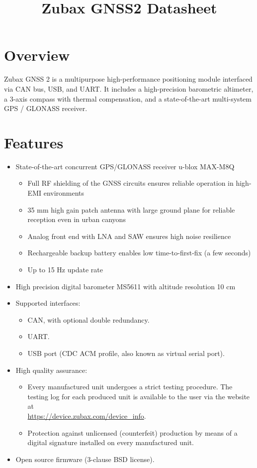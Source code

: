 \documentclass{zubaxdoc}
\title{Zubax GNSS2 Datasheet}
\begin{document}
\frontmatter

\begin{titlepage}

\section*{Overview}

Zubax GNSS 2 is a multipurpose high-performance positioning module interfaced via CAN bus, USB, and UART. It includes a high-precision barometric altimeter, a 3-axis compass with thermal compensation, and a state-of-the-art multi-system GPS / GLONASS receiver.
\section*{Features}

\begin{itemize}
    \item State-of-the-art concurrent GPS/GLONASS receiver u-blox MAX-M8Q
    \begin{itemize}
    		\item Full RF shielding of the GNSS circuits ensures reliable operation in high-EMI environments
    		\item 35 mm high gain patch antenna with large ground plane for reliable reception even in urban canyons
    		\item Analog front end with LNA and SAW ensures high noise resilience
    		\item Rechargeable backup battery enables low time-to-first-fix (a few seconds)
    		\item Up to 15 Hz update rate
    	\end{itemize}
	\item High precision digital barometer MS5611 with  altitude resolution 10 cm
	\item Supported interfaces:
    \begin{itemize}
        \item CAN, with optional double redundancy.
        \item UART.
        \item USB port (CDC ACM profile, also known as virtual serial port).
    \end{itemize}
    \item High quality assurance:
    \begin{itemize}
        \item Every manufactured unit undergoes a strict testing procedure.
        The testing log for each produced unit is available to the user via the website at\\
        \url{https://device.zubax.com/device_info}.
        \item Protection against unlicensed (counterfeit) production by means of a digital signature
        installed on every manufactured unit.
    \end{itemize}
    \item Open source firmware (3-clause BSD license).
\end{itemize}


\end{titlepage}
\end{document}
